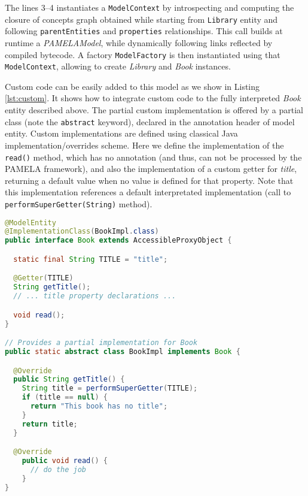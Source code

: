 The lines 3--4 instantiates a \texttt{ModelContext} by introspecting and computing the closure of concepts graph obtained while starting from \texttt{Library} entity and following \texttt{parentEntities} and \texttt{properties} relationships. This call builds at runtime a \emph{PAMELAModel}, while dynamically following links reflected by compiled bytecode. A factory \texttt{ModelFactory} is then instantiated using that \texttt{ModelContext}, allowing to create \emph{Library} and \emph{Book} instances.

Custom code can be easily added to this model as we show in Listing \ref{lst:custom}. It shows how to integrate custom code to the fully interpreted \emph{Book} entity described above. The partial custom implementation is offered by a partial class (note the \texttt{abstract} keyword), declared in the annotation header of model entity. Custom implementations are defined using classical Java implementation/overrides scheme. Here we define the implementation of the \texttt{read()} method, which has no annotation (and thus, can not be processed by the PAMELA framework), and also the implementation of a custom getter for \emph{title}, returning a default value when no value is defined for that property. Note that this implementation references a default interpretated implementation (call to \texttt{performSuperGetter(String)} method).

\begin{lstlisting}[language=Java,basicstyle=\ttfamily\footnotesize,caption=Custom Code, label=lst:custom]
@ModelEntity
@ImplementationClass(BookImpl.class)
public interface Book extends AccessibleProxyObject {

  static final String TITLE = "title";

  @Getter(TITLE)
  String getTitle();
  // ... title property declarations ...

  void read();
}

// Provides a partial implementation for Book
public static abstract class BookImpl implements Book {

  @Override
  public String getTitle() {
    String title = performSuperGetter(TITLE);
    if (title == null) {
      return "This book has no title";
    }
    return title;
  }

  @Override
    public void read() {
      // do the job
    }
}
\end{lstlisting}
